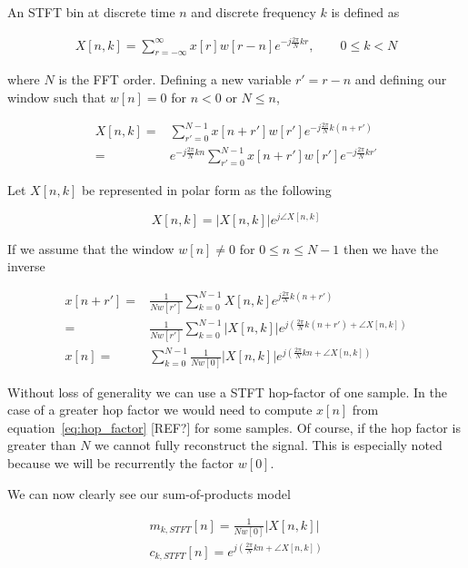 \documentclass [11pt, proquest,oneside] {ganter_thesis}[2015/03/03]
\begin{document}
An STFT bin at discrete time $n$ and discrete frequency $k$ is defined as

\begin{align}
\label{eq:STFTdefinition}
X[n,k] = \sum\limits_{r=-\infty}^{\infty} x[r] w[r - n] e^{-j\frac{2\pi}{N}kr}, \qquad 0 \leq k < N
\end{align}

where $N$ is the FFT order.  Defining a new variable $r' = r - n$ and defining our window such that  $w[n] = 0$ for $n < 0$ or $N \leq n$,

\begin{align}
X[n,k] =& \sum\limits_{r'=0}^{N-1} x[n + r'] w[r'] e^{-j\frac{2\pi}{N}k(n + r')} \nonumber \\
=& e^{-j\frac{2\pi}{N}kn} \sum\limits_{r'=0}^{N-1} x[n + r'] w[r'] e^{-j\frac{2\pi}{N}kr'}
\end{align}

Let $X[n,k]$ be represented in polar form as the following

\begin{equation}
X[n,k] = \vert X[n,k]\vert e^{j\angle X[n,k]}
\end{equation}

If we assume that the window $w[n] \neq 0$ for $0 \leq n \leq N-1$ then we have the inverse

\begin{align}
\label{eq:hop_factor}
x[n + r'] =& \frac{1}{Nw[r']}  \sum\limits_{k=0}^{N-1} X[n,k] e^{j\frac{2\pi}{N}k(n+r')} \nonumber \\
=& \frac{1}{Nw[r']}  \sum\limits_{k=0}^{N-1} \vert X[n,k]\vert e^{j(\frac{2\pi}{N}k(n+r') + \angle X[n,k])} \\
x[n] =&\sum\limits_{k=0}^{N-1}  \frac{1}{Nw[0]}  \vert X[n,k]\vert e^{j(\frac{2\pi}{N}kn + \angle X[n,k])}
\end{align}

Without loss of generality we can use a STFT hop-factor of one sample.  In the case of a greater hop factor we would need to compute $x[n]$ from equation~\ref{eq:hop_factor} [REF?] for some samples.  Of course, if the hop factor is greater than $N$ we cannot fully reconstruct the signal.  This is especially noted because we will be recurrently the factor $w[0]$.

We can now clearly see our sum-of-products model

\begin{align}
\label{eq:envelope_STFT}
m_{k,STFT}[n] =  \frac{1}{Nw[0]}  \vert X[n,k]\vert \\
c_{k,STFT}[n] = e^{j(\frac{2\pi}{N}kn + \angle X[n,k])}
\end{align}
\end{document}
